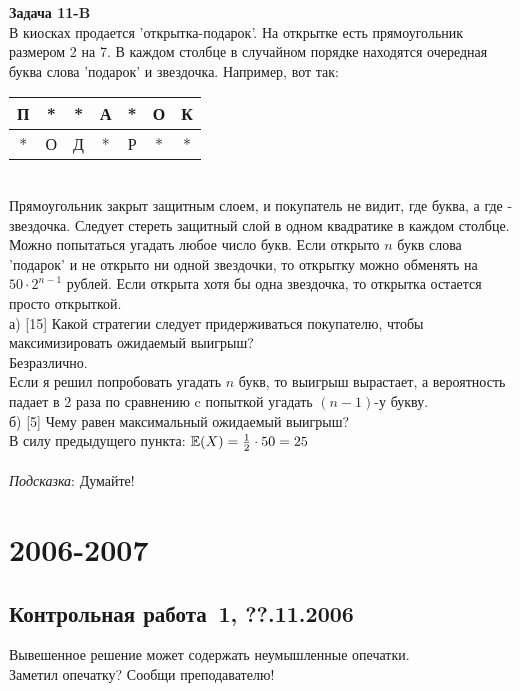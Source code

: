 \documentclass[pdftex,12pt,a4paper]{article}
\begin{document}
{\bf Задача 11-B} \\
В киосках продается 'открытка-подарок'. На открытке есть
прямоугольник размером 2 на 7. В каждом столбце в случайном
порядке находятся очередная буква слова 'подарок' и звездочка.
Например, вот так: \\
\begin{tabular}{|c|c|c|c|c|c|c|}
  \hline
  П & * & * & А & * & О & К \\
  \hline
  * & О & Д & * & Р & * & * \\
  \hline
\end{tabular} \\
Прямоугольник закрыт защитным слоем, и покупатель не видит, где
буква, а где - звездочка. Следует стереть защитный слой в одном
квадратике в каждом столбце. Можно попытаться угадать любое число
букв. Если открыто $n$ букв слова 'подарок' и не открыто ни одной
звездочки, то открытку можно обменять на $50\cdot 2^{n-1}$ рублей.
Если открыта хотя бы одна звездочка, то открытка
остается просто открыткой. \\
а) [15] Какой стратегии следует придерживаться покупателю, чтобы
максимизировать ожидаемый выигрыш? \\
Безразлично. \\
Если я решил попробовать угадать $n$ букв, то выигрыш вырастает, а
вероятность падает в 2 раза по сравнению c попыткой угадать $(n-1)$-у букву.  \\
б) [5] Чему равен максимальный ожидаемый выигрыш? \\
В силу предыдущего пункта: $\mathbb{E}(X)=\frac{1}{2}\cdot 50=25$ \\ \\
\emph{Подсказка}: Думайте! \\




\section{2006-2007}


\subsection{Контрольная работа \No\,1, ??.11.2006}

Вывешенное решение может содержать неумышленные опечатки. \\
Заметил опечатку? Сообщи преподавателю! \\
\end{document}

